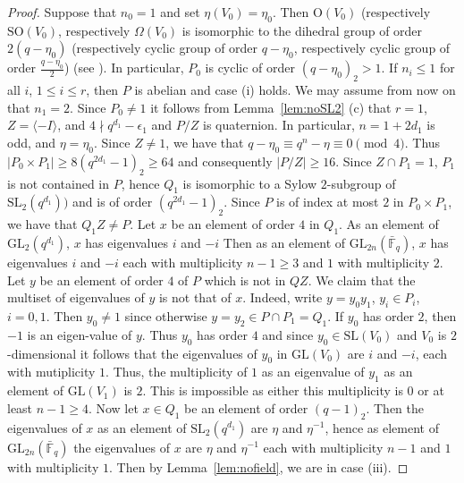 \documentclass{amsart}
\theoremstyle{plain}\newtheorem{Theorem}{Theorem}[section]
\theoremstyle{plain}\newtheorem{Conjecture}[Theorem]{Conjecture}
\theoremstyle{plain}\newtheorem{Corollary}[Theorem]{Corollary}
\theoremstyle{plain}\newtheorem{Lemma}[Theorem]{Lemma}
\theoremstyle{plain}\newtheorem{Proposition}[Theorem]{Proposition}
\theoremstyle{definition}\newtheorem{Definition}[Theorem]{Definition}
\theoremstyle{definition}\newtheorem{Example}[Theorem]{Example}
\theoremstyle{definition}\newtheorem{Examples}[Theorem]{Examples}
\theoremstyle{definition}\newtheorem{Exercise}[Theorem]{Exercise}
\theoremstyle{definition}\newtheorem{Notation}[Theorem]{Notation}
\theoremstyle{definition}\newtheorem{Remark}[Theorem]{Remark}
\theoremstyle{definition}\newtheorem{Remarks}[Theorem]{Remarks}
\def\GL{\mathrm{GL}}
\def \O{\mathrm{O}}
\def\SL{\mathrm{SL}}
\def\SO{\mathrm{SO}}
\numberwithin{equation}{section}
\begin{document}
\begin{proof}
 Suppose that $n_0=1 $  and set  $\eta(V_0) =\eta_0 $. Then  $\O (V_0) $ (respectively   $\SO(V_0)$, respectively   $\Omega(V_0) $ is  isomorphic to the dihedral group of order $2 (q-\eta_0)$  (respectively cyclic group of order $q-\eta_0$,  respectively cyclic group of order   $\frac{q-\eta_0}{2}$) (see \cite[Thm.~11.4]{Tay06}).    
In particular,    $P_0$ is   cyclic of order $   (q -\eta_0)_2  > 1 $.  If $n_i \leq 1 $ for all $i$, $1\leq i \leq r$, then  $P$ is abelian   and case (i) holds.  We  may assume from now on  that  $n_1 =2$.    Since $P_0 \ne 1 $    it follows from Lemma~\ref{lem:noSL2} (c) that $r=1 $,  $Z =\langle -I \rangle  $,  and   $ 4 \nmid  q^{d_1}  - \epsilon_1  $  and $P/Z$  is quaternion. 
In particular,  $ n = 1  +2d_1 $ is odd, and $\eta =\eta_0$.
Since $Z \ne1 $, we have that   $q- \eta_0 \equiv     q^{n} - \eta  \equiv 0 \pmod 4$.   Thus  $|P_0 \times P_1| \geq   8(q^{2d_1} -1) _2 \geq 64  $   and  consequently $|P/Z| \geq 16 $.  Since $ Z \cap P_1  =1 $, $ P_1  $ is not contained in   $P$, hence  $Q_1 $  is  isomorphic to a Sylow $2$-subgroup of  $\SL_2(q^{d_1}) ) $   and is of  order  $(q^{2d_1} -1) _2 $. Since $P$ is of index at most $2$ in $P_0 \times P_1 $, we  have  that $Q_1Z \ne P $.
Let $x$ be an element of order $4$ in $Q_1$.   As an element of $\GL_2(q^{d_1})$,  $ x$  has eigenvalues $i$ and $-i $ Then  as an element of $\GL_{2n}(\bar{\mathbb F}_q)$, $x$ has eigenvalues $i$ and $-i$  each with multiplicity  $n-1 \geq  3 $ and  $1$ with multiplicity  $2$.
Let $y$ be  an element of order $4$  of $P$ which is not in $QZ$. We claim that  the multiset of  eigenvalues  of $y$ is not that of $x$.  
Indeed, write  $y = y_0y_1$, $y_i \in P_i$, $ i=0,1$. Then $y_0 \ne 1$  since otherwise $y =y_2 \in P \cap  P_1 = Q_1$.  If $y_0 $  has order $2$, then $-1$  is an eigen-value of $y$. Thus $y_0$  has order $4$ and  since $y_0  \in \SL(V_0)$ and $V_0$ is  $2$-dimensional it follows that  the eigenvalues of  $y_0$ in $\GL(V_0) $ are $i$  and  $-i$, each with mutiplicity  $1$. Thus,  the  multiplicity  of  $1$  as  an eigenvalue of  $y_1$ as an element of $\GL (V_1)$  is   $2$.   This is impossible as  either this multiplicity is $0$ or   at least $n-1 \geq  4$.   Now let $x \in Q_1$ be an element of  order $(q-1)_2$.  Then  the eigenvalues of  $x$ as an element of $\SL_2(q^{d_1})   $ are  $\eta $ and $\eta^{-1}$, hence  as element of   $\GL_{2n} (\bar {\mathbb F}_q)$   the eigenvalues of   $x$  are  
  $\eta $ and $\eta^{-1}$  each with multiplicity  $n-1 $ and  $1$  with multiplicity  $1 $. Then by Lemma~\ref{lem:nofield}, we are in case (iii).  




\end{proof}
\end{document}
